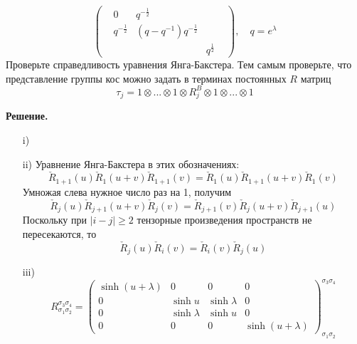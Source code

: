 \documentclass[12pt]{article}
\theoremstyle{definition}
\begin{document}
\begin{enumerate}
\begin{itemize}
\begin{equation}
\begin{pmatrix}
                &0&q^{-\frac{1}{2}}&&\\
                &q^{-\frac{1}{2}} & (q-q^{-1})q^{-\frac{1}{2}}&\\
                &&&q^{\frac{1}{2}}
            \end{pmatrix},\quad q=e^\lambda
        \end{equation}
        Проверьте справедливость уравнения Янга-Бакстера. Тем самым проверьте, что представление группы кос можно задать в терминах постоянных $R$ матриц
        \begin{equation}
            \tau_j=1\otimes...\otimes1\otimes R^B_j\otimes1\otimes...\otimes1
        \end{equation}
    \end{itemize}
    \textbf{Решение.}
    \begin{itemize}
        \item[i)]
        \item[ii)] Уравнение Янга-Бакстера в этих обозначениях:
        \begin{equation}
            \check{R}_{1+1}(u)\check{R}_1(u+v)\check{R}_{1+1}(v)=\check{R}_1(u)\check{R}_{1+1}(u+v)\check{R}_1(v)
        \end{equation}
        Умножая слева нужное число раз на 1, получим
        \begin{equation}
            \boxed{\check{R}_j(u)\check{R}_{j+1}(u+v)\check{R}_j(v)=\check{R}_{j+1}(v)\check{R}_j(u+v)\check{R}_{j+1}(u)}
        \end{equation}
        Поскольку при $|i-j|\geq2$ тензорные произведения пространств не пересекаются, то
        \begin{equation}
            \boxed{\check{R}_j(u)\check{R}_i(v)=\check{R}_i(v)\check{R}_j(u)}
        \end{equation}
        \item[iii)]
        \begin{equation}
            R^{\sigma_3\sigma_4}_{\sigma_1\sigma_2}=
            \begin{pmatrix}
                \sinh(u+\lambda) & 0 & 0 & 0\\
                0 & \sinh u & \sinh\lambda & 0\\
                0 & \sinh\lambda & \sinh u & 0\\
                0 & 0 & 0 & \sinh(u+\lambda)
            \end{pmatrix}_{\sigma_1\sigma_2}^{\sigma_3\sigma_4}
        \end{equation}
        \begin{equation}

\end{equation}
\end{itemize}
\end{enumerate}
\end{document}
